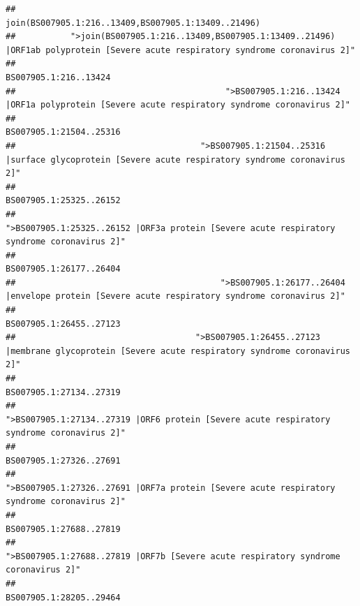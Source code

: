 \documentclass[
]{article}
\begin{document}
\begin{verbatim}
##                                                                                    join(BS007905.1:216..13409,BS007905.1:13409..21496) 
##           ">join(BS007905.1:216..13409,BS007905.1:13409..21496) |ORF1ab polyprotein [Severe acute respiratory syndrome coronavirus 2]" 
##                                                                                                                  BS007905.1:216..13424 
##                                          ">BS007905.1:216..13424 |ORF1a polyprotein [Severe acute respiratory syndrome coronavirus 2]" 
##                                                                                                                BS007905.1:21504..25316 
##                                     ">BS007905.1:21504..25316 |surface glycoprotein [Severe acute respiratory syndrome coronavirus 2]" 
##                                                                                                                BS007905.1:25325..26152 
##                                            ">BS007905.1:25325..26152 |ORF3a protein [Severe acute respiratory syndrome coronavirus 2]" 
##                                                                                                                BS007905.1:26177..26404 
##                                         ">BS007905.1:26177..26404 |envelope protein [Severe acute respiratory syndrome coronavirus 2]" 
##                                                                                                                BS007905.1:26455..27123 
##                                    ">BS007905.1:26455..27123 |membrane glycoprotein [Severe acute respiratory syndrome coronavirus 2]" 
##                                                                                                                BS007905.1:27134..27319 
##                                             ">BS007905.1:27134..27319 |ORF6 protein [Severe acute respiratory syndrome coronavirus 2]" 
##                                                                                                                BS007905.1:27326..27691 
##                                            ">BS007905.1:27326..27691 |ORF7a protein [Severe acute respiratory syndrome coronavirus 2]" 
##                                                                                                                BS007905.1:27688..27819 
##                                                    ">BS007905.1:27688..27819 |ORF7b [Severe acute respiratory syndrome coronavirus 2]" 
##                                                                                                                BS007905.1:28205..29464 

\end{verbatim}
\end{document}
